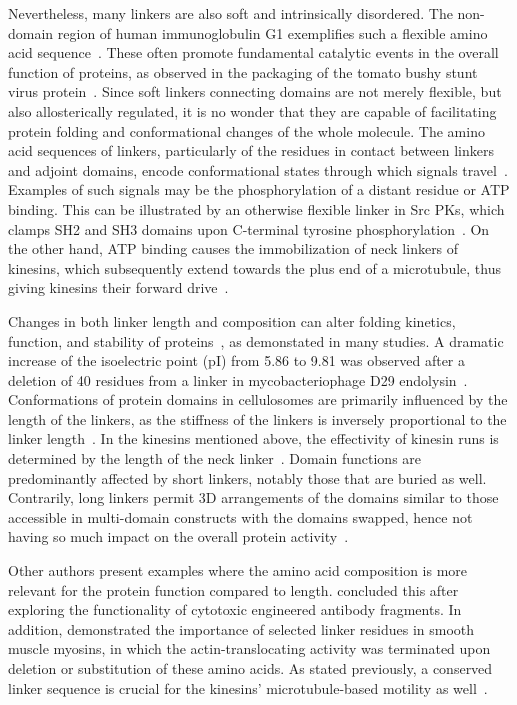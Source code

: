   Nevertheless, many linkers are also soft and intrinsically disordered.
  The non-domain region of human immunoglobulin G1 exemplifies such a flexible amino acid
  sequence~\cite{colman1976structure}.
  These often promote fundamental catalytic events in the overall function of proteins, as
  observed in the packaging of the tomato bushy stunt virus
  protein~\cite{winkler1977tomato}.
  Since soft linkers connecting domains are not merely flexible, but also allosterically
  regulated, it is no wonder that they are capable of facilitating protein folding and
  conformational changes of the whole molecule.
  The amino acid sequences of linkers, particularly of the residues in contact
  between linkers and adjoint domains, encode conformational states through which signals
  travel~\cite{george2002analysis, ma2011dynamic}.
  Examples of such signals may be the phosphorylation of a distant residue or ATP binding.
  This can be illustrated by an otherwise flexible linker in Src PKs, which clamps
  SH2 and SH3 domains upon C-terminal tyrosine phosphorylation~\cite{young2001dynamic}.
  On the other hand, ATP binding causes the immobilization of neck linkers of kinesins,
  which subsequently extend towards the plus end of a microtubule, thus giving kinesins
  their forward drive~\cite{rice1999structural, rosenfeld2001atp, khalil2008kinesin}.

  Changes in both linker length and composition can alter folding kinetics, function, and
  stability of proteins~\cite{van1997linker, robinson1998optimizing}, as demonstated in
  many studies.
  A dramatic increase of the isoelectric point (pI) from 5.86 to 9.81 was observed after a
  deletion of 40 residues from a linker in mycobacteriophage D29
  endolysin~\cite{pohane2015modulation}.
  Conformations of protein domains in cellulosomes are primarily influenced by the length
  of the linkers, as the stiffness of the linkers is inversely proportional to the linker
  length~\cite{rozycki2017length}.
  In the kinesins mentioned above, the effectivity of kinesin runs is determined by the
  length of the neck linker~\cite{shastry2010neck}.
  Domain functions are predominantly affected by short linkers, notably those that
  are buried as well.
  Contrarily, long linkers permit 3D arrangements of the domains similar to those
  accessible in multi-domain constructs with the domains swapped, hence not having so much impact on the overall protein activity~\cite{bashton2002geometry}.

  Other authors present examples where the amino acid composition is more relevant for
  the protein function compared to length.
  \citet{klement2015effect} concluded this after exploring the functionality of cytotoxic
  engineered antibody fragments.
  In addition, \citet{ikebe1998hinge} demonstrated the importance of selected linker
  residues in smooth muscle myosins, in which the actin-translocating activity was
  terminated upon deletion or substitution of these amino acids.
  As stated previously, a conserved linker sequence is crucial for the kinesins'
  microtubule-based motility as well~\cite{case2000role, hariharan2009insights}.

